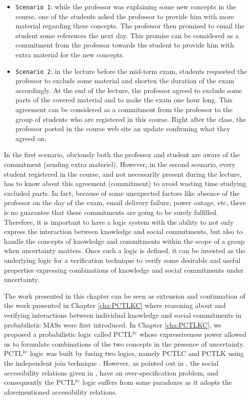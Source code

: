 \begin{itemize}
\item \verb"Scenario 1": while the professor was explaining some
new concepts in the course, one of the students asked the
professor to provide him with more material regarding these
concepts. The professor then promised to email the student some
references the next day. This promise can be considered as a
commitment from the professor towards the student to provide him
with extra material for the new concepts. \item \verb"Scenario 2":
in the lecture before the mid-term exam, students requested the
professor to exclude some material and shorten the duration of the
exam accordingly. At the end of the lecture, the professor agreed
to exclude some parts of the covered material and to make the exam
one hour long.  This agreement can be considered as a commitment
from the professor to the group of students who are registered in
this course. Right after the class, the professor posted in the
course web site an update confirming what they agreed on.
\end{itemize}
In the first scenario, obviously both the professor and student
are aware of the commitment (sending extra materiel). However, in
the second scenario, every student registered in the course, and
not necessarily present during the lecture,  has to know about
this agreement (commitment) to avoid wasting time studying
excluded parts. In fact, because of some unexpected factors like
absence of the professor on the day of the exam, email delivery
failure, power outage, etc, there is no guarantee that these
commitments are  going to be surely fulfilled. Therefore, it is
important to have a logic system with the ability to not only
express the interaction between knowledge and social commitments,
but also to handle the concepts of knowledge and commitments
within the scope of a group when uncertainty matters. Once such a
logic is defined, it can be invested as the underlying logic for a
verification technique to verify some desirable and useful
properties expressing combinations of knowledge and social
commitments under uncertainty.

The work presented in this chapter can be seen as extension and continuation of the work presented in Chapter \ref{cha:PCTLKC} where reasoning about and verifying interactions between individual knowledge and social commitments in probabilistic MASs were first introduced. In Chapter \ref{cha:PCTLKC}, we proposed a probabilistic logic called PCTL$^{kc}$ whose expressiveness power allowed us to formulate combinations of the two concepts in the presence of uncertainty. PCTL$^{kc}$ logic was built by fusing two logics, namely PCTLC \cite{Sultan2013} and PCTLK \cite{Wan2013} using the
independent join technique \cite{Franceschet2004}. However, as pointed out in \cite{Al-Saqqar2014a}, the social accessibility relations given in \cite{Bentahar2012,El-Menshawy2013a}, have an over-specification problem, and consequently the PCTL$^{kc}$ logic suffers from some paradoxes as it adopts the aforementioned accessibility relations.

